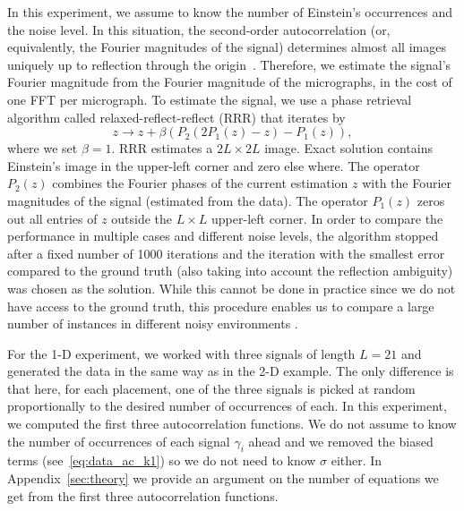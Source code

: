 \documentclass[english,11pt]{article}
\newcommand{\TODO}[1]{{\color{red}{[#1]}}}
\numberwithin{equation}{section}
\theoremstyle{plain}
\theoremstyle{definition}
\theoremstyle{remark}
\theoremstyle{plain}
\theoremstyle{remark}
\theoremstyle{plain}
\theoremstyle{plain}
\begin{document}
In this experiment, we assume to know the number of Einstein's occurrences and the noise level. 
In this situation, the second-order autocorrelation (or, equivalently, the Fourier magnitudes of the signal) determines  almost all images  uniquely up to reflection through the origin~\cite{hayes1982reconstruction,bendory2017fourier}. 
Therefore, we estimate the signal's Fourier magnitude from the Fourier magnitude of the micrographs, in the cost of one  FFT per micrograph.
To estimate the signal, we use a phase retrieval algorithm called relaxed-reflect-reflect (RRR) that iterates by
\begin{equation}
z \rightarrow z + \beta (P_2(2P_1(z) - z) - P_1(z)),
\end{equation}
where we set $\beta=1$.
RRR estimates a $2L\times 2L$ image. Exact solution contains Einstein's image in the upper-left corner and zero else where. The operator $P_2(z)$ combines the Fourier phases of  the current estimation $z$ with the Fourier magnitudes of the signal  (estimated from the data). The operator $P_1(z)$ zeros out all entries of $z$ outside the $L\times L$ upper-left corner. 
In order to compare the performance in multiple cases and different noise levels, the algorithm stopped after a fixed number of 1000 iterations and the iteration with the smallest error compared to the ground truth (also taking into account the reflection ambiguity) was chosen as the solution. While this cannot be done in practice since we do not have access to the ground truth, this procedure enables us to compare a large number of instances in different noisy environments \TODO{Note the last two sentences!}.

For the 1-D experiment, we worked with three signals of length $L = 21$ and generated the data in the same way as in the 2-D example.
The only difference is that here, for each
placement, one of the three signals is picked at random proportionally to the desired number
of occurrences of each.
In this experiment, we computed the first three autocorrelation functions. 
We do not assume to know the number of occurrences of each signal $\gamma_i$ ahead and we removed the biased terms (see~\eqref{eq:data_ac_k1}) so we do not need to know $\sigma$ either. 
In Appendix~\ref{sec:theory} we provide an argument on the number of equations we get from the first three autocorrelation functions. 
\end{document}
